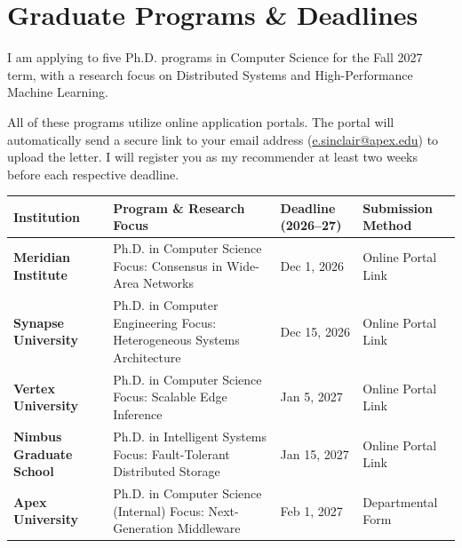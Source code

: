 \section{Graduate Programs \& Deadlines}

\noindent
I am applying to five Ph.D. programs in Computer Science for the Fall 2027 term, with a research focus on Distributed Systems and High-Performance Machine Learning. 

\medskip\noindent
All of these programs utilize online application portals. The portal will automatically send a secure link to your email address (\href{mailto:e.sinclair@apex.edu}{e.sinclair@apex.edu}) to upload the letter. I will register you as my recommender at least two weeks before each respective deadline.

\vspace{1.5em}

\noindent
\begin{tabularx}{\textwidth}{>{\bfseries}l X l l}
\toprule
\textbf{\color{primary}Institution} & \textbf{\color{primary}Program \& Research Focus} & \textbf{\color{primary}Deadline (2026--27)} & \textbf{\color{primary}Submission Method} \\
\midrule
Meridian Institute & Ph.D. in Computer Science \newline Focus: Consensus in Wide-Area Networks & Dec 1, 2026 & Online Portal Link \\
\rowcolor{lightBg} Synapse University & Ph.D. in Computer Engineering \newline Focus: Heterogeneous Systems Architecture & Dec 15, 2026 & Online Portal Link \\
Vertex University & Ph.D. in Computer Science \newline Focus: Scalable Edge Inference & Jan 5, 2027 & Online Portal Link \\
\rowcolor{lightBg} Nimbus Graduate School & Ph.D. in Intelligent Systems \newline Focus: Fault-Tolerant Distributed Storage & Jan 15, 2027 & Online Portal Link \\
Apex University & Ph.D. in Computer Science (Internal) \newline Focus: Next-Generation Middleware & Feb 1, 2027 & Departmental Form \\
\bottomrule
\end{tabularx}

\vspace{2.5em}

